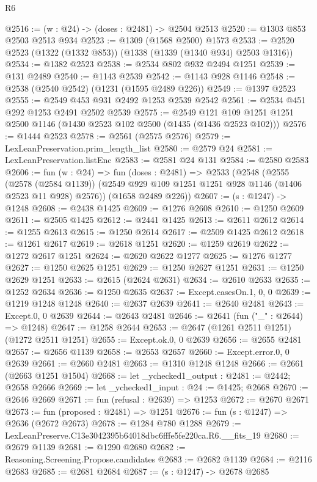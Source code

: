 \begin{lexlean}{R6}
\begin{coremodule}
@2516 := (w : @24) -> (doses : @2481) -> @2504 @2513
@2520 := @1303 @853 @2503 @2513 @934
@2523 := @1309 (@1568 @2500) @1573
@2533 := @2520 @2523 (@1322 (@1332 @853)) (@1338 (@1339 (@1340 @934) @2503 @1316))
@2534 := @1382 @2523
@2538 := @2534 @802 @932 @2494 @1251
@2539 := @131 @2489
@2540 := @1143 @2539
@2542 := @1143 @928 @1146
@2548 := @2538 (@2540 @2542) (@1231 (@1595 @2489 @226))
@2549 := @1397 @2523
@2555 := @2549 @453 @931 @2492 @1253 @2539 @2542
@2561 := @2534 @451 @292 @1253 @2491 @2502 @2539
@2575 := @2549 @121 @109 @1251 @1251 @2500 @1146 (@1430 @2523 @102 @2500 (@1435 (@1436 @2523 @102)))
@2576 := @1444 @2523
@2578 := @2561 (@2575 @2576)
@2579 := LexLeanPreservation.prim_length_list
@2580 := @2579 @24
@2581 := LexLeanPreservation.listEnc
@2583 := @2581 @24 @131
@2584 := @2580 @2583
@2606 := fun (w : @24) =>
  fun (doses : @2481) =>
  @2533
    (@2548
      (@2555
        (@2578 (@2584 @1139))
        (@2549 @929 @109 @1251 @1251 @928 @1146 (@1406 @2523 @11 @928) @2576))
      (@1658 @2489 @226))
@2607 := (s : @1247) -> @1248
@2608 := @2438 @1425
@2609 := @1276 @2608
@2610 := @1250 @2609
@2611 := @2505 @1425
@2612 := @2441 @1425
@2613 := @2611 @2612
@2614 := @1255 @2613
@2615 := @1250 @2614
@2617 := @2509 @1425 @2612
@2618 := @1261 @2617
@2619 := @2618 @1251
@2620 := @1259 @2619
@2622 := @1272 @2617 @1251
@2624 := @2620 @2622 @1277
@2625 := @1276 @1277
@2627 := @1250 @2625 @1251
@2629 := @1250 @2627 @1251
@2631 := @1250 @2629 @1251
@2633 := @2615 (@2624 @2631)
@2634 := @2610 @2633
@2635 := @1252 @2634
@2636 := @1250 @2635
@2637 := Except.casesOn.{1, 0, 0}
@2639 := @1219 @1248 @1248
@2640 := @2637 @2639
@2641 := @2640 @2481
@2643 := Except.{0, 0} @2639
@2644 := @2643 @2481
@2646 := @2641 (fun ("_" : @2644) => @1248)
@2647 := @1258 @2644
@2653 := @2647 (@1261 @2511 @1251) (@1272 @2511 @1251)
@2655 := Except.ok.{0, 0} @2639
@2656 := @2655 @2481
@2657 := @2656 @1139
@2658 := @2653 @2657
@2660 := Except.error.{0, 0} @2639
@2661 := @2660 @2481
@2663 := @1310 @1248 @1248
@2666 := @2661 (@2663 @1251 @1504)
@2668 := let _ychecked1_output : @2481 := @2442; @2658 @2666
@2669 := let _ychecked1_input : @24 := @1425; @2668
@2670 := @2646 @2669
@2671 := fun (refusal : @2639) => @1253
@2672 := @2670 @2671
@2673 := fun (proposed : @2481) => @1251
@2676 := fun (s : @1247) => @2636 (@2672 @2673)
@2678 := @1284 @780 @1288
@2679 := LexLeanPreserve.C13e3042395b64018dbc6fffe5fe220ca.R6.__fits_19
@2680 := @2679 @1139
@2681 := @1290 @2680
@2682 := Reasoning.Screening.Propose.candidates
@2683 := @2682 @1139
@2684 := @2116 @2683
@2685 := @2681 @2684
@2687 := (s : @1247) -> @2678 @2685

\end{coremodule}
\end{lexlean}
